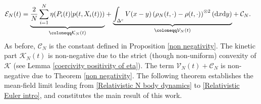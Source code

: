 \documentclass[11pt,reqno]{amsart}
\numberwithin{equation}{section}
\def\dd{{\rm d}}
\begin{document}
\begin{align}
\mathcal{E}_{N}(t)&=\underset{\coloneqq \mathcal{K}_{N}(t)}{\underbrace{\frac{2}{N}\sum_{i=1}^{N}    \eta(P_{i}(t)\vert p(t,X_{i}(t)))}}+\underset{\coloneqq \mathcal{V}_{N}(t)}{\underbrace{\int_{\Delta^{c}}V(x-y)\left(\rho_{N}(t,\cdot)-\rho(t,\cdot)\right)^{\otimes 2}(\dd x\dd y)}}+\mathcal{C}_{N}. \label{Renormalized relativistic modulated energy} \end{align}
As before, $\mathcal{C}_{N}$ is the constant defined in Proposition \ref{non negativity}. The kinetic part $\mathcal{K}_{N}(t)$ is non-negative due to the strict (though non-uniform) convexity of $\mathscr{K}$ (see Lemma \ref{coercivity positivity of eta}). The term $\mathcal{V}_{N}(t)+\mathcal{C}_{N}$ is non-negative due to Theorem \ref{non negativity}. The following theorem establishes the mean-field limit leading from \eqref{Relativistic N body dynamics} to \eqref{Relativistic Euler intro}, and constitutes the main result of this work.  
\end{document}

